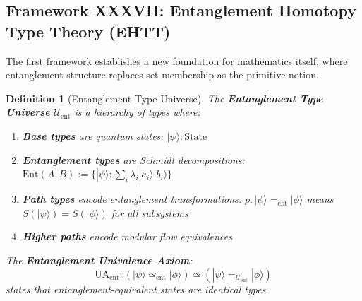 \documentclass[12pt,a4paper]{article}
\newtheorem{definition}[theorem]{Definition}
\begin{document}
\subsection{Framework XXXVII: Entanglement Homotopy Type Theory (EHTT)}

The first framework establishes a new foundation for mathematics itself, where entanglement structure replaces set membership as the primitive notion.

\begin{definition}[Entanglement Type Universe]\label{def:ehtt-universe}
The \textbf{Entanglement Type Universe} $\mathcal{U}_{\text{ent}}$ is a hierarchy of types where:
\begin{enumerate}
    \item \textbf{Base types} are quantum states: $|\psi\rangle : \text{State}$
    \item \textbf{Entanglement types} are Schmidt decompositions: $\text{Ent}(A,B) := \{|\psi\rangle : \sum_i \lambda_i |a_i\rangle|b_i\rangle\}$
    \item \textbf{Path types} encode entanglement transformations: $p : |\psi\rangle =_{\text{ent}} |\phi\rangle$ means $S(|\psi\rangle) = S(|\phi\rangle)$ for all subsystems
    \item \textbf{Higher paths} encode modular flow equivalences
\end{enumerate}

The \textbf{Entanglement Univalence Axiom}:
\begin{equation}
\text{UA}_{\text{ent}}: (|\psi\rangle \simeq_{\text{ent}} |\phi\rangle) \simeq (|\psi\rangle =_{\mathcal{U}_{\text{ent}}} |\phi\rangle)
\end{equation}
states that entanglement-equivalent states are identical types.
\end{definition}
\end{document}
